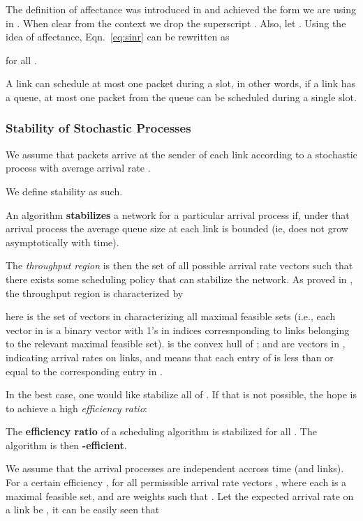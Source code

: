 \documentclass[11pt]{amsart}
\begin{document}
The definition of affectance was introduced in \cite{GHWW09} and achieved the form
we are using in \cite{KV10}.
When clear from the context we drop the superscript . 
Also, let .
Using the idea of affectance, Eqn.~\ref{eq:sinr} can be rewritten as 

for all .

 A link can schedule at most one packet during a slot, in other words,
if a link has a queue, at most one packet from the queue can be scheduled during a single slot.

\subsubsection*{Stability of Stochastic Processes}

We assume that packets arrive at the sender of each link  according to a stochastic
process with average arrival rate .

We define stability as such.
\begin{defn}
An algorithm \textbf{stabilizes} a network for a particular arrival process if, under that
arrival process the average queue size at each link is bounded (ie, does not grow asymptotically with time).
\end{defn}
The \emph{throughput region} is then the set of all possible arrival rate
vectors such that there exists some scheduling policy that can stabilize the
network.
As proved in \cite{TE92}, the throughput region is characterized by

here  is the set of vectors in  characterizing 
all maximal feasible sets (i.e., each vector in  is a binary vector with
1's in indices corresnponding to links belonging to the relevant maximal feasible set). 
 is the convex hull of ;  and  are vectors in , indicating arrival rates on links, and  means that each entry of  is less than or equal to the corresponding entry in .

In the best case, one would like stabilize all of . If that is not possible, the hope is to achieve a high \emph{efficiency ratio}:

\begin{defn}
The \textbf{efficiency ratio}  of a scheduling algorithm 
is  stabilized for all
. 
The algorithm is then \textbf{-efficient}.
\end{defn}
We assume that the arrival processes are independent accross time (and links).
For a certain efficiency , for all permissible arrival rate vectors ,  where each  is a maximal feasible set, and  are weights such that . Let the
expected arrival rate on a link  be , it can be easily seen that 
\end{document}
